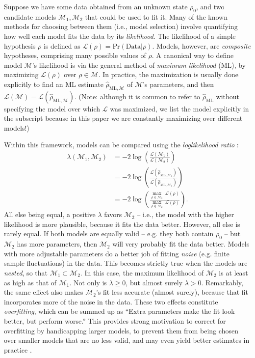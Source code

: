 \documentclass[aps,pra, twocolumn]{revtex4-1}
\newcommand{\M}{\mathcal{M}}
\newcommand{\cL}{\mathcal{L}}
\newcommand{\rhohat}{\hat{\rho}}
\newcommand{\rhoML}[1]{\rhohat_{\scriptscriptstyle{\mathrm{ML},#1}}}
\begin{document}
Suppose we have some data obtained from an unknown state $\rho_{0}$, and two candidate models $\M_{1}, \M_{2}$ that could be used to fit it.  Many of the known methods for choosing between them (i.e., model selection) involve quantifying how well each model fits the data by its \emph{likelihood}.  The likelihood of a simple hypothesis $\rho$ is defined as $\mathcal{L}(\rho) = \mathrm{Pr}(\mathrm{Data}|\rho)$.  Models, however, are \emph{composite} hypotheses, comprising many possible values of $\rho$.  A canonical way to define model $\M$'s likelihood is via the general method of \emph{maximum likelihood} (ML), by maximizing $\cL(\rho)$ over $\rho\in\M$.  In practice, the maximization is usually done explicitly to find an ML estimate $\hat{\rho}_{\mathrm{ML},\M}$ \cite{Hradil1997, JamesPRA2001, Blume-Kohout2010} of $\M$'s parameters, and then $\cL(\M) = \cL(\hat{\rho}_{\mathrm{ML},\M})$.  (Note: although it is common to refer to $\hat\rho_{\mathrm{ML}}$ without specifying the model over which $\cL$ was maximized, we list the model explicitly in the subscript because in this paper we are constantly maximizing over different models!)

Within this framework, models can be compared using the \emph{loglikelihood ratio} \cite{Neyman1933, Blume-Kohout2010, Moroder2013}:
\begin{align}
\lambda(\M_{1}, \M_{2}) &= -2 \log \left(\frac{\cL(\M_{1})}{\cL(\M_{2})}\right)\\
&= -2 \log \left(\frac{\cL(\rhoML{\M_{1}})}{\cL(\rhoML{\M_{2}})}\right)\\
&= -2 \log \left(\frac{\underset{\rho \in \M_{1}}{\max}~\cL(\rho)}{\underset{\rho \in \M_{2}}{\max}~\cL(\rho)}\right).
\end{align}
All else being equal, a positive $\lambda$ favors $\M_2$ -- i.e., the model with the higher likelihood is more plausible, because it fits the data better.  However, all else is rarely equal.  If both models are equally valid -- e.g. they both contain $\rho_0$ -- but $\M_2$ has more parameters, then $\M_2$ will very probably fit the data better.  Models with more adjustable parameters do a better job of fitting \emph{noise} (e.g. finite sample fluctuations) in the data.  This becomes strictly true when the models are \emph{nested}, so that $\M_{1} \subset \M_{2}$.  In this case, the maximum likelihood of $\M_{2}$ is at least as high as that of $\M_{1}$.  Not only is $\lambda \geq 0$, but almost surely $\lambda > 0$.  Remarkably, the same effect also makes $\M_{2}$'s fit less accurate (almost surely), because that fit incorporates more of the noise in the data.  These two effects constitute \emph{overfitting}, which can be summed up as ``Extra parameters make the fit look better, but perform worse.''  This provides strong motivation to correct for overfitting by handicapping larger models, to prevent them from being chosen over smaller models that are no less valid, and may even yield better estimates in practice \cite{Akaike1974}.
\end{document}
